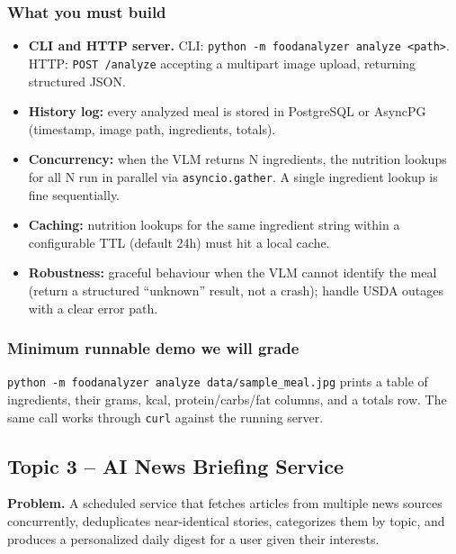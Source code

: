 \documentclass[11pt,a4paper]{article}
\begin{document}
\subsubsection{What you must build}
\begin{itemize}[topsep=2pt,itemsep=1pt]
  \item \textbf{CLI and HTTP server.} CLI: \texttt{python -m foodanalyzer analyze <path>}. HTTP: \texttt{POST /analyze} accepting a multipart image upload, returning structured JSON.
  \item \textbf{History log:} every analyzed meal is stored in PostgreSQL or AsyncPG (timestamp, image path, ingredients, totals).
  \item \textbf{Concurrency:} when the VLM returns N ingredients, the nutrition lookups for all N run in parallel via \texttt{asyncio.gather}. A single ingredient lookup is fine sequentially.
  \item \textbf{Caching:} nutrition lookups for the same ingredient string within a configurable TTL (default 24h) must hit a local cache.
  \item \textbf{Robustness:} graceful behaviour when the VLM cannot identify the meal (return a structured ``unknown'' result, not a crash); handle USDA outages with a clear error path.
\end{itemize}

\subsubsection{Minimum runnable demo we will grade}
\texttt{python -m foodanalyzer analyze data/sample\_meal.jpg} prints a table of ingredients, their grams, kcal, protein/carbs/fat columns, and a totals row. The same call works through \texttt{curl} against the running server.

\subsection{Topic 3 -- AI News Briefing Service}
\textbf{Problem.} A scheduled service that fetches articles from multiple news sources concurrently, deduplicates near-identical stories, categorizes them by topic, and produces a personalized daily digest for a user given their interests.
\end{document}
